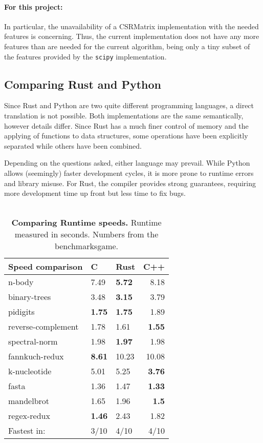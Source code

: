 \paragraph{For this project:} In particular, the unavailability of a CSRMatrix
implementation with the needed features is concerning. Thus, the current
implementation does not have any more features than are needed for the current
algorithm, being only a tiny subset of the features provided by the
\verb|scipy| implementation.


\newpage
\subsection{Comparing Rust and Python}\label{sec:rustvspython}

Since Rust and Python are two quite different programming languages, a direct
translation is not possible. Both implementations are the same semantically,
however details differ. Since Rust has a much finer control of memory and the
applying of functions to data structures, some operations have been explicitly
separated while others have been combined.

Depending on the questions asked, either language may prevail. While Python
allows (seemingly) faster development cycles, it is more prone to runtime
errors and library misuse. For Rust, the compiler provides strong guarantees,
requiring more development time up front but less time to fix bugs. \\ \\


\begin{table}[htb]
\begin{tabular}{@{}lllr@{}}
    \textbf{Speed comparison} & C & Rust & C++ \\ \midrule
    n-body & 7.49 & \textbf{5.72} & 8.18 \\
    binary-trees & 3.48 & \textbf{3.15} & 3.79 \\
    pidigits & \textbf{1.75} & \textbf{1.75} & 1.89 \\
    reverse-complement & 1.78 & 1.61 & \textbf{1.55} \\
    spectral-norm & 1.98 & \textbf{1.97} & 1.98 \\
    fannkuch-redux & \textbf{8.61} & 10.23 & 10.08 \\
    k-nucleotide & 5.01 & 5.25 & \textbf{3.76} \\
    fasta & 1.36 & 1.47 & \textbf{1.33} \\
    mandelbrot & 1.65 & 1.96 & \textbf{1.5} \\
    regex-redux & \textbf{1.46} & 2.43 & 1.82 \\ \midrule
    Fastest in: & 3/10 & 4/10 & 4/10 \\
\end{tabular}
    \caption[Runtime Comparison Between Rust/C/C++]{\textbf{Comparing Runtime speeds.} Runtime measured in seconds. Numbers from the benchmarksgame\footnotemark.}
    \label{tab:runtime}
\end{table}

